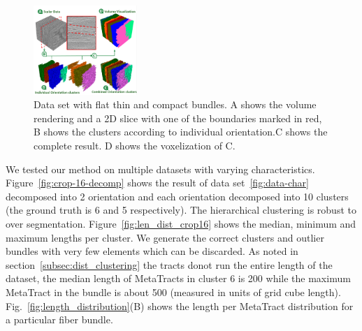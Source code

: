 \begin{figure}
\centering
	\includegraphics[width=0.35\textwidth]{imagesMT2014/crop-6.PNG}
	\caption{Data set with flat thin and compact bundles. A shows the volume rendering and a 2D slice with one of the boundaries marked in red, B shows the clusters according to individual orientation.C shows the complete result. D shows the voxelization of C.}
	\label{fig:prepreg}
\end{figure}






We tested our method on multiple datasets with varying characteristics. 
Figure~\ref{fig:crop-16-decomp} shows the result of data set~\ref{fig:data-char} decomposed into 2 orientation and each orientation decomposed into 10 clusters (the ground truth is 6 and 5 respectively). The hierarchical clustering is robust to over segmentation.
Figure~\ref{fig:len_dist_crop16} shows the median, minimum and maximum lengths per cluster. We generate the correct clusters and outlier bundles with very few elements which can be discarded. As noted in section~\ref{subsec:dist_clustering} the tracts donot run the entire length of the dataset, the median length of MetaTracts in cluster 6 is 200 while the maximum MetaTract in the bundle is about 500 (measured in units of grid cube length). Fig.~\ref{fig:length_distribution}(B) shows the length per MetaTract distribution for a particular fiber bundle. 

